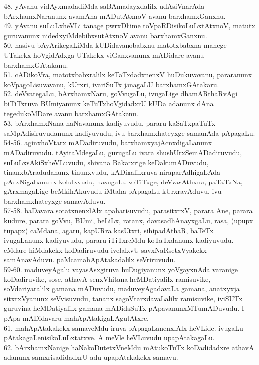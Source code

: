 \documentclass{article}
\begin{document}
48. yAvanu vidAyxmadadiMda saBAmadayxdalilx udAsiVnarAda bArxhamxNaranunx avamAna mADutAtxnoV avanu barxhamxGanxnu.\\
49. yAvanu suLuLxheVLi tanage pwrxDhime toVpaRDisikoLuLxtAtxnoV, matutx guruvanunx nidedxyiMdebibxsutAtxnoV avanu barxhamxGanxnu.\\
50. hasivu bAyArikegaLiMda kUDidavanobabxnu matotxbabxna manege UTakekx hoVgidAdxga UTakekx viGanxvanunx mADidare avanu barxhamxGAtakanu.\\
51. cADikoVra, matotxbabxralilx keTaTxdadxnenxV huDukuvavanu, pararanunx koVpagoLisuvavanu, kUrxri, ivariSuTx janagaLU barxhamxGAtakaru.\\
52. deVvategaLu, bArxhamxNaru, goVvugaLu, ivugaLige dhamARthaRvAgi biTiTxruva BUmiyanunx keTuTxhoVgidadxrU kUDa adanunx dAna tegedukoMDare avanu barxhamxGAtakanu.\\
53. bArxhamxNana haNavanunx kadiyuvudu, pararu kaSaTxpaTuTx saMpAdisiruvudanunx kadiyuvudu, ivu barxhamxhateyxge samanAda pApagaLu.\\
54-56. aginxhoVtarx mADadiruvudu, barxhamxyajAcnxdigaLanunx mADadiruvudu. tAyitaMdegaLu, gurugaLu ivara shushUrxSemADadiruvudu, suLuLxsAkiSxheVLuvudu, shivana Bakatxrige keDakumADuvudu, tinanxbAradudanunx tinunxvudu, kADinalilxruva niraparAdhigaLAda pArxNigaLanunx kolulxvudu, hasugaLa koTiTxge, deVvasAthxna, paTaTxNa, gArxmagaLige beMkihAkuvudu iMtaha pApagaLu kUrxravAduvu. ivu barxhamxhateyxge samavAduvu.\\
57-58. baDavara sotatxnenxlAlx apaharisuvudu, parasitxrxV, parara Ane, parara kudure, parara goVvu, BUmi, beLiLx, ratanx, davasadhAnayxgaLu, rasa, (upupx tupapx) caMdana, agaru, kapURra kasUtxri, sihipadAthaR, baTeTx ivugaLanunx kadiyuvudu, pararu iTiTxreMdu koTaTxdanunx kadiyuvudu. eMdare hiMdakekx koDadiruvudu ivelalxvU savxNaRsetxVyakekx samAnavAduvu. paMcamahApAtakadalilx seVriruvudu.\\
59-60. maduveyAgalu vayasAsxgiruva huDugiyanunx yoVgayxnAda varanige koDadiruvike, sose, athavA senxVhitana heMDatiyalilx ramisuvike, soVdariyaralilx gamana mADuvudu, maduveyAgadavaLa gamana, anatxyxja sitxrxVyanunx seVvisuvudu, tananx sagoVtarxdavaLalilx ramisuvike, iviSUTx guruvina heMDatiyalilx gamana mADidaSuTx pApavanunxMTumADuvudu. I pApa mADidavaru mahApAtakigaLAgutAtxre.\\
61. mahApAtakakekx samaveMdu iruva pApagaLanenxlAlx heVLide. ivugaLu pAtakagaLenisikoLuLxtatxve. A meVle heVLuvudu upapAtakagaLu.\\
62. bArxhamxNanige haNakoDutetxVneMdu mAtukoTuTx koDadidadxre athavA adanunx samxrisadidadxrU adu upapAtakakekx samavu.\\
\end{document}
